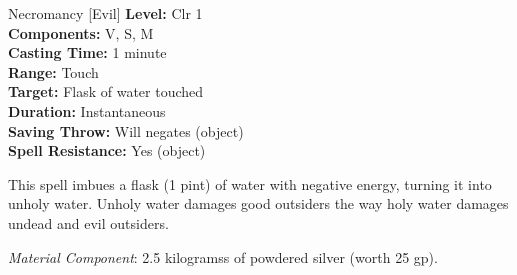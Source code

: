 {Necromancy [Evil]}
{
	\textbf{Level:}
	Clr 1\\
	\textbf{Components:}
	V, S, M\\
	\textbf{Casting Time:}
	1 minute\\
	\textbf{Range:}
	Touch\\
	\textbf{Target:}
	Flask of water touched\\
	\textbf{Duration:}
	Instantaneous\\
	\textbf{Saving Throw:}
	Will negates (object)\\
	\textbf{Spell Resistance:}
	Yes (object)\\
}
{
	This spell imbues a flask (1 pint) of water with negative energy, turning it into unholy water. Unholy water damages good outsiders the way holy water damages undead and evil outsiders.

	\textit{Material Component}:
	2.5 kilogramss of powdered silver (worth 25 gp).

}
